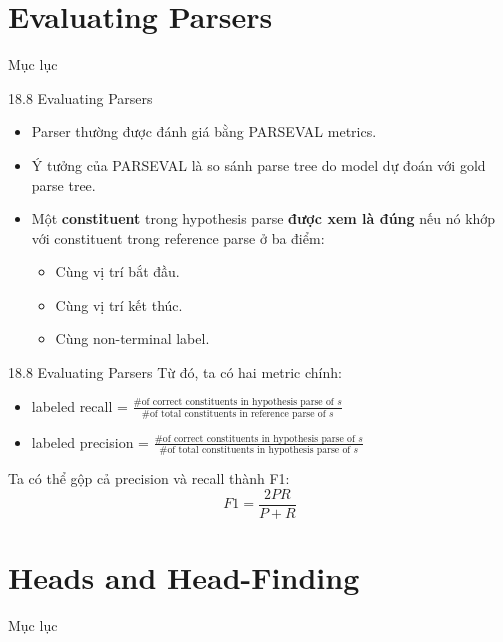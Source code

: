 \documentclass[11pt]{beamer}
\begin{document}
	
	\section{Evaluating Parsers}
	\begin{frame}{Mục lục}
		\tableofcontents[currentsection]
	\end{frame}
	\begin{frame}{18.8 Evaluating Parsers}
		\begin{itemize}
			\item Parser thường được đánh giá bằng PARSEVAL metrics.
			
			\item Ý tưởng của PARSEVAL là so sánh parse tree do model dự đoán với gold parse tree.
			
			\item Một \textbf{constituent} trong hypothesis parse \textbf{được xem là đúng} nếu nó khớp với constituent trong reference parse ở ba điểm:
			\begin{itemize}
			\item Cùng vị trí bắt đầu.
			\item Cùng vị trí kết thúc.
			\item Cùng non-terminal label.
			\end{itemize}
		\end{itemize}
	\end{frame}
	
	\begin{frame}{18.8 Evaluating Parsers}
		Từ đó, ta có hai metric chính:
	\begin{itemize}
		\item labeled recall = $\frac{\text{\# of correct constituents in hypothesis parse of } s}{\text{\# of total constituents in reference parse of } s}$
		
		\vspace{0.5cm}
		
		\item labeled precision = $\frac{\text{\# of correct constituents in hypothesis parse of } s}{\text{\# of total constituents in hypothesis parse of } s}$
	\end{itemize}
		\pause
		\vspace{0.5cm}
		Ta có thể gộp cả precision và recall thành F1:
		\begin{equation}
			F1 = \frac{2PR}{P + R}
			\tag{18.12}
		\end{equation}
	\end{frame}

	\section{Heads and Head-Finding}
	\begin{frame}{Mục lục}
		\tableofcontents[currentsection]
	\end{frame}
	
\end{document}
